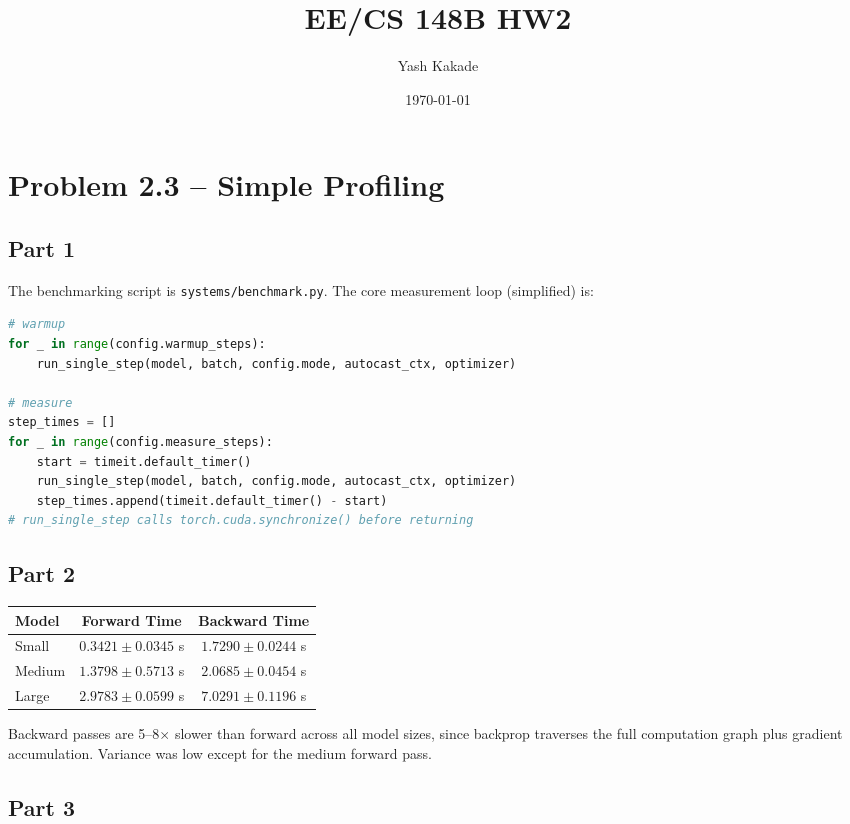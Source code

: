 \documentclass[11pt]{article}
\title{EE/CS 148B HW2}
\author{Yash Kakade}
\date{\today}
\begin{document}
\maketitle

\section{Problem 2.3 -- Simple Profiling}

\subsection*{Part 1}

The benchmarking script is \texttt{systems/benchmark.py}.
The core measurement loop (simplified) is:

\begin{lstlisting}[language=Python]
# warmup
for _ in range(config.warmup_steps):
    run_single_step(model, batch, config.mode, autocast_ctx, optimizer)

# measure
step_times = []
for _ in range(config.measure_steps):
    start = timeit.default_timer()
    run_single_step(model, batch, config.mode, autocast_ctx, optimizer)
    step_times.append(timeit.default_timer() - start)
# run_single_step calls torch.cuda.synchronize() before returning
\end{lstlisting}

\subsection*{Part 2}

\begin{table}[h]
\centering
\begin{tabular}{lcc}
\toprule
Model & Forward Time & Backward Time \\
\midrule
Small & $0.3421 \pm 0.0345$ s & $1.7290 \pm 0.0244$ s \\
Medium & $1.3798 \pm 0.5713$ s & $2.0685 \pm 0.0454$ s \\
Large & $2.9783 \pm 0.0599$ s & $7.0291 \pm 0.1196$ s \\
\bottomrule
\end{tabular}
\end{table}

Backward passes are 5--8$\times$ slower than forward across all model sizes, since backprop traverses the full computation graph plus gradient accumulation. Variance was low except for the medium forward pass.

\subsection*{Part 3}
\end{document}
